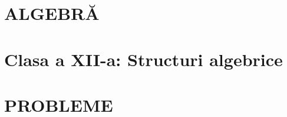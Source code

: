 

\renewcommand{\titluserie}{Algebră pentru Olimpiadă}
\renewcommand{\numarvolum}{4}
\renewcommand{\titluvolum}{clasa a XII-a}
\renewcommand{\subtitluvolum}{Grupuri, inele, corpuri și polinoame peste un corp}
\renewcommand{\despreacestvolum}{Cuprinde structurile algebrice de clasa a XII-a: grupuri, inele, corpuri și polinoame peste un corp.}
\renewcommand{\celelaltevolume}{analizei de clasa a XI-a, analizei de clasa a XII-a și algebrei liniare}





\clearpage\color{ink}
\part{ALGEBRĂ}

\part{Clasa a XII-a: Structuri algebrice}


\clearpage
\part{PROBLEME}
\lhead{\small\textcolor{grey}{Probleme de algebră}}
\nopagebreak
{}





